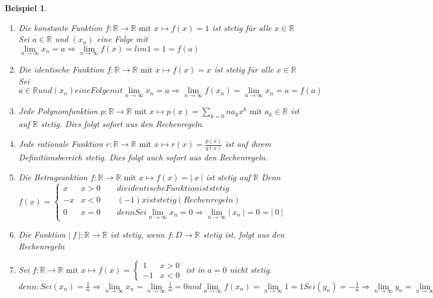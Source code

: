 \documentclass[a4paper,titlepage,oneside]{article}
\def\R{\ensuremath{\mathbb{R}} }
\renewcommand{\liminf}[2][n]{\ensuremath{\lim\limits_{#1 \rightarrow \infty}{#2}}}
\newcommand{\abs}[1]{\ensuremath{\left|\:#1\:\right|}}
\theoremstyle{thmstyle}
\newtheorem{bsp}[satz]{Beispiel}
\begin{document}
\begin{bsp}
\begin{enumerate}
\item Die konstante Funktion $ f : \R \to \R \text{ mit } x \mapsto f(x) = 1 $ ist stetig für alle $x \in \R$
Sei $a \in \R$ und $(x_n)$ eine Folge mit $\liminf{x_n} = a \Rightarrow \liminf{f(x)} = lim 1 = 1 = f(a)$

\item Die identische Funktion $f : \R \to \R \text{ mit } x \mapsto f(x) = x $  ist stetig für alle $x \in \R$
Sei $a\in \R und (x_n) eine Folge mit \liminf{x_n} = a \Rightarrow \liminf{f(x_n)} = \liminf{x_n} = a = f(a)$

\item Jede Polynomfunktion $p : \R \to \R \text{ mit } x \mapsto p(x) = \sum_{k=0}{n}{a_kx^k} \text{ mit } a_k \in \R $ ist auf \R stetig.
Dies folgt sofort aus den Rechenregeln.

\item Jede rationale Funktion  $r : \R \to \R \text{ mit } x \mapsto r(x) = \frac{p(x)}{q(x)} $ ist auf ihrem Definitionsbereich stetig.
Dies folgt auch sofort aus den Rechenregeln.

\item Die Betragsunktion $f : \R \to \R \text{ mit } x \mapsto f(x) = \abs{x} $  ist stetig auf \R
Denn $f(x) = \begin{cases}
x & x > 0 \qquad die identische Funktion ist stetig \\
-x & x < 0 \qquad (-1)x ist stetig (Rechenregeln) \\
0 & x = 0 \qquad denn Sei \liminf{x_n} = 0 \Rightarrow \liminf{\abs{x_n}} = 0 = \abs{0}
\end{cases}$

\item Die Funktion $\abs{f} : \R \to \R $  ist stetig, wenn $ f: D \to \R $ stetig ist.
folgt aus den Rechenregeln

\item Sei $f : \R \to \R \text{ mit } x \mapsto f(x) = \begin{cases} 1 & x > 0 \\ -1 & x < 0\end{cases} $ ist in $a = 0$ nicht stetig. %
\begin{math}
denn: Sei (x_n) =  \frac{1}{n} \Rightarrow \liminf{x_n} = \liminf{\frac{1}{n}} = 0  und \liminf{f(x_n)} = \liminf{1} = 1 
Sei (y_n) = - \frac{1}{n} \Rightarrow \liminf{y_n} = \liminf{-\frac{1}{n}} = 0  und \liminf{f(y_n)} = \liminf{-1} = -1 
\Rightarrow f ist nicht stetig in a = 0
\end{math}


\end{enumerate}
\end{bsp}
\end{document}
